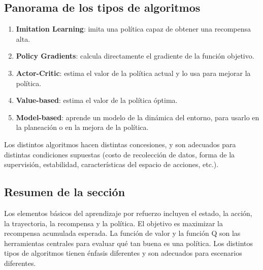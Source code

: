 \subsection{Panorama de los tipos de algoritmos}

\begin{enumerate}
    \item \textbf{Imitation Learning}: imita una política capaz de obtener una recompensa alta.
    \item \textbf{Policy Gradients}: calcula directamente el gradiente de la función objetivo.
    \item \textbf{Actor-Critic}: estima el valor de la política actual y lo usa para mejorar la política.
    \item \textbf{Value-based}: estima el valor de la política óptima.
    \item \textbf{Model-based}: aprende un modelo de la dinámica del entorno, para usarlo en la planeación o en la mejora de la política.
\end{enumerate}

Los distintos algoritmos hacen distintas concesiones, y son adecuados para distintas condiciones supuestas (costo de recolección de datos, forma de la supervisión, estabilidad, características del espacio de acciones, etc.).

\subsection{Resumen de la sección}

Los elementos básicos del aprendizaje por refuerzo incluyen el estado, la acción, la trayectoria, la recompensa y la política. El objetivo es maximizar la recompensa acumulada esperada. La función de valor y la función Q son las herramientas centrales para evaluar qué tan buena es una política. Los distintos tipos de algoritmos tienen énfasis diferentes y son adecuados para escenarios diferentes.

